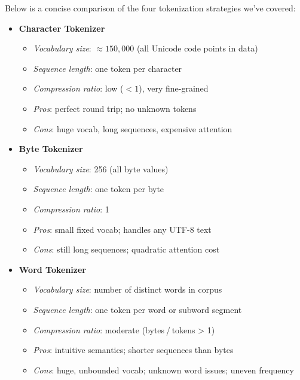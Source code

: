 Below is a concise comparison of the four tokenization strategies we've covered:

\begin{itemize}[leftmargin=*]
  \item \textbf{Character Tokenizer}
    \begin{itemize}[leftmargin=1em,noitemsep]
      \item \emph{Vocabulary size}: \(\approx150{,}000\) (all Unicode code points in data)
      \item \emph{Sequence length}: one token per character
      \item \emph{Compression ratio}: low (\(<1\)), very fine-grained
      \item \emph{Pros}: perfect round trip; no unknown tokens  
      \item \emph{Cons}: huge vocab, long sequences, expensive attention  
    \end{itemize}

  \item \textbf{Byte Tokenizer}
    \begin{itemize}[leftmargin=1em,noitemsep]
      \item \emph{Vocabulary size}: 256 (all byte values)
      \item \emph{Sequence length}: one token per byte
      \item \emph{Compression ratio}: 1
      \item \emph{Pros}: small fixed vocab; handles any UTF-8 text  
      \item \emph{Cons}: still long sequences; quadratic attention cost  
    \end{itemize}

  \item \textbf{Word Tokenizer}
    \begin{itemize}[leftmargin=1em,noitemsep]
      \item \emph{Vocabulary size}: number of distinct words in corpus
      \item \emph{Sequence length}: one token per word or subword segment
      \item \emph{Compression ratio}: moderate (bytes / tokens > 1)
      \item \emph{Pros}: intuitive semantics; shorter sequences than bytes  
      \item \emph{Cons}: huge, unbounded vocab; unknown word issues; uneven frequency  
    \end{itemize}


\end{itemize}
